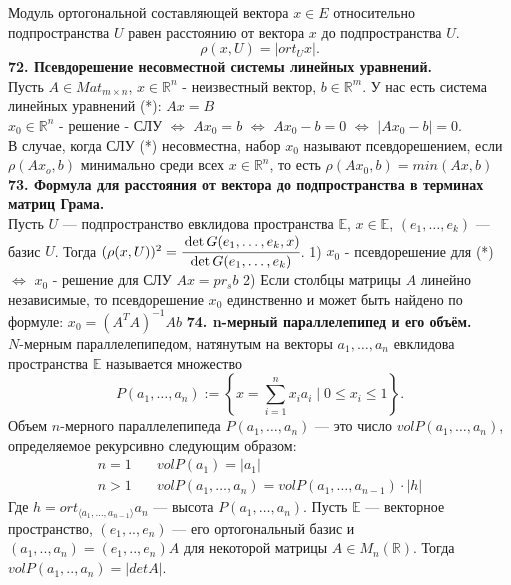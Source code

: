 \documentclass{article}
\begin{document}
Модуль ортогональной составляющей вектора $x \in E$ относительно подпространства $U$ равен расстоянию от вектора $x$ до подпространства $U$.
$$
\rho (x,U) = |ort_U x|.
$$
\newline
\newline
\textbf{72. Псевдорешение несовместной системы линейных уравнений.}\\
Пусть $A\in Mat_{m\times n}$, $x\in \mathbb{R}^n$ - неизвестный вектор, $b \in \mathbb{R}^m$. У нас есть система линейных уравнений (*): $Ax=B$\\ 
$x_0 \in \mathbb{R}^n$ - решение - СЛУ $\Leftrightarrow$ $Ax_0=b$ $\Leftrightarrow$ $Ax_0-b=0$  $\Leftrightarrow$ $|Ax_0-b|=0$.\\ 
В случае, когда СЛУ (*) несовместна, набор $x_0$ называют псевдорешением, если $\rho(Ax_o,b)$ минимально среди всех $x \in \mathbb{R}^n$, то есть $\rho(Ax_0, b)=min(Ax,b)$
\newline
\newline
\textbf{73. Формула для расстояния от вектора до подпространства в терминах матриц Грама.}\\
Пусть $U$ --- подпространство евклидова пространства $\mathbb{E}$, $x \in \mathbb{E}$, $(e_1, \ldots, e_k)$ --- базис $U$. Тогда 
$(\rho(x,U))^2 = \cfrac{\det G(e_1, \ldots, e_k, x)}{\det G(e_1, \ldots, e_k)}$.
1) $x_0$ - псевдорешение для (*) $\Leftrightarrow$ $x_0$ - решение для СЛУ $Ax=pr_sb$
2) Если столбцы матрицы $A$ линейно независимые, то псевдорешение $x_0$ единственно и может быть найдено по формуле: $x_0=(A^TA)^{-1}Ab$
\newline
\newline
\textbf{74. n-мерный параллелепипед и его объём.}\\
$N$-мерным параллелепипедом, натянутым на векторы $a_1, \ldots, a_n$ евклидова пространства $\mathbb{E}$ называется множество 
$$
P(a_1, \ldots, a_n) := \left\{ x = \sum_{i = 1}^n x_ia_i \mid 0 \leqslant x_i \leqslant 1 \right\}.
$$  
Объем $n$-мерного параллелепипеда $P(a_1, \ldots, a_{n})$ --- это число $vol P(a_1, \ldots, a_{n})$, определяемое рекурсивно следующим образом:
\begin{align*}
n = 1 \quad& vol P(a_1) = |a_1| \\
n > 1 \quad& vol P(a_1, \ldots, a_n) = vol P(a_1, \ldots, a_{n-1})\cdot |h|
\end{align*}
Где $h = ort_{\langle a_1, \ldots, a_{n-1}\rangle}a_n$ --- высота $P(a_1, \ldots, a_n)$.
Пусть $\mathbb{E}$ --- векторное пространство, $(e_1,..,e_n)$ --- его ортогональный базис и $(a_1,..,a_n) = (e_1,..,e_n)A$ для некоторой матрицы $A \in M_n(\mathbb{R})$. Тогда $vol P(a_1,..,a_n) = |det A|$.
\end{document}

